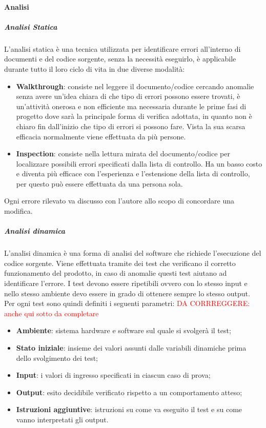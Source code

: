		\paragraph{Analisi}
			\subparagraph{Analisi Statica} \Spazio
			L'analisi statica è una tecnica utilizzata per identificare errori all'interno di documenti e del codice sorgente, senza la necessità eseguirlo, è applicabile durante tutto il loro ciclo di vita in due diverse modalità:
			\begin{itemize}
				\item \textbf{Walkthrough}:
				consiste nel leggere il documento/codice cercando anomalie senza avere un'idea chiara di che tipo di errori possono essere trovati, è un'attività onerosa e non efficiente ma necessaria durante le prime fasi di progetto dove sarà la principale forma di verifica adottata, in quanto non è chiaro fin dall'inizio che tipo di errori si possono fare.
				Vista la sua scarsa efficacia normalmente viene effettuata da più persone.
				\item \textbf{Inspection}: 
				consiste nella lettura mirata del documento/codice per localizzare possibili errori specificati dalla lista di controllo. Ha un basso costo e diventa più efficace con l'esperienza e l'estensione della lista di controllo, per questo può essere effettuata da una persona sola.
			\end{itemize}
		    Ogni errore rilevato va discusso con l'autore allo scopo di concordare una modifica.
			\subparagraph{Analisi dinamica} \Spazio
			L'analisi dinamica è una forma di analisi del software che richiede l'esecuzione del codice sorgente. Viene effettuata tramite dei test che verificano il corretto funzionamento del prodotto, in caso di anomalie questi test aiutano ad identificare l'errore.
			I test devono essere ripetibili ovvero con lo stesso input e nello stesso ambiente devo essere in grado di ottenere sempre lo stesso output. Per ogni test sono quindi definiti i seguenti parametri:
			\textcolor{red}{DA CORRREGGERE: anche qui sotto da completare}
			\begin{itemize}
				\item \textbf{Ambiente}: sistema hardware e software sul quale si svolgerà il test;
				\item \textbf{Stato iniziale}: insieme dei valori assunti dalle variabili dinamiche prima dello svolgimento dei test;
				\item \textbf{Input}: i valori di ingresso specificati in ciascun caso di prova;
				\item \textbf{Output}: esito decidibile verificato rispetto a un comportamento atteso;
				\item \textbf{Istruzioni aggiuntive}: istruzioni su come va eseguito il test e su come vanno interpretati gli output.
			\end{itemize}
